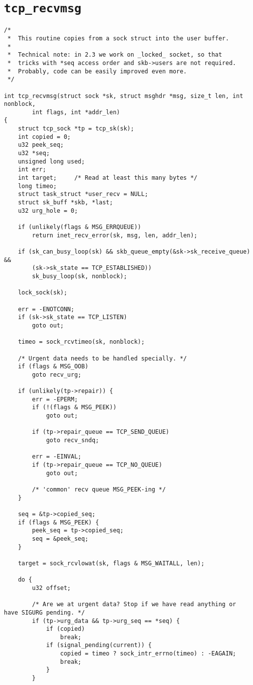 	\section{\texttt{tcp_recvmsg}}
\begin{verbatim}
/*
 *	This routine copies from a sock struct into the user buffer.
 *
 *	Technical note: in 2.3 we work on _locked_ socket, so that
 *	tricks with *seq access order and skb->users are not required.
 *	Probably, code can be easily improved even more.
 */

int tcp_recvmsg(struct sock *sk, struct msghdr *msg, size_t len, int nonblock,
		int flags, int *addr_len)
{
	struct tcp_sock *tp = tcp_sk(sk);
	int copied = 0;
	u32 peek_seq;
	u32 *seq;
	unsigned long used;
	int err;
	int target;		/* Read at least this many bytes */
	long timeo;
	struct task_struct *user_recv = NULL;
	struct sk_buff *skb, *last;
	u32 urg_hole = 0;

	if (unlikely(flags & MSG_ERRQUEUE))
		return inet_recv_error(sk, msg, len, addr_len);

	if (sk_can_busy_loop(sk) && skb_queue_empty(&sk->sk_receive_queue) &&
	    (sk->sk_state == TCP_ESTABLISHED))
		sk_busy_loop(sk, nonblock);

	lock_sock(sk);

	err = -ENOTCONN;
	if (sk->sk_state == TCP_LISTEN)
		goto out;

	timeo = sock_rcvtimeo(sk, nonblock);

	/* Urgent data needs to be handled specially. */
	if (flags & MSG_OOB)
		goto recv_urg;

	if (unlikely(tp->repair)) {
		err = -EPERM;
		if (!(flags & MSG_PEEK))
			goto out;

		if (tp->repair_queue == TCP_SEND_QUEUE)
			goto recv_sndq;

		err = -EINVAL;
		if (tp->repair_queue == TCP_NO_QUEUE)
			goto out;

		/* 'common' recv queue MSG_PEEK-ing */
	}

	seq = &tp->copied_seq;
	if (flags & MSG_PEEK) {
		peek_seq = tp->copied_seq;
		seq = &peek_seq;
	}

	target = sock_rcvlowat(sk, flags & MSG_WAITALL, len);

	do {
		u32 offset;

		/* Are we at urgent data? Stop if we have read anything or have SIGURG pending. */
		if (tp->urg_data && tp->urg_seq == *seq) {
			if (copied)
				break;
			if (signal_pending(current)) {
				copied = timeo ? sock_intr_errno(timeo) : -EAGAIN;
				break;
			}
		}


\end{verbatim}

